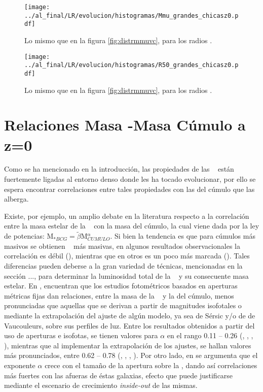 \begin{figure}[H]
 \centering
 \texttt{[image: ../al\_final/LR/evolucion/histogramas/Mmu\_grandes\_chicasz0.pdf]}
\caption{Lo mismo que en la figura \ref{fig:distrmmuvc}, para los radios \mvc.}
\label{fig:distrrmuvc}
\end{figure}

\begin{figure}[H]
 \centering
 \texttt{[image: ../al\_final/LR/evolucion/histogramas/R50\_grandes\_chicasz0.pdf]}
\caption{Lo mismo que en la figura \ref{fig:distrmmuvc}, para los radios \rum.}
\label{fig:distrrum}
\end{figure}



\section{Relaciones Masa \bcg-Masa C\'umulo a z=0}
\label{sec:mbcgmcum}

Como se ha mencionado en la introducci\'on, las propiedades de las 
\bcgs~ est\'an fuertemente ligadas al entorno denso
donde les ha tocado evolucionar, por ello se espera encontrar 
correlaciones entre tales propiedades con las
del c\'umulo que las alberga. 

Existe, por ejemplo, un amplio debate en la literatura respecto a la
correlaci\'on entre la masa estelar de la \bcg~ con la masa del c\'umulo,
la cual viene dada por la ley de potencias: M$_{*BCG}=\widetilde{\beta}$M$_{CUMULO}^{\alpha}$.	 
Si bien la tendencia es que para c\'umulos m\'as masivos se obtienen 
\bcgs~ m\'as masivas, en algunos resultados observacionales
la correlaci\'on es d\'ebil (\cite{whi08}), mientras que en otros es un poco m\'as
marcada (\cite{bel16}). 
Tales diferencias pueden deberse a la
gran variedad de t\'ecnicas, mencionadas en la secci\'on ..., para determinar la luminosidad total de la \bcg~ y 
su consecuente masa estelar. En \cite{haa10},
encuentran que los estudios fotom\'etricos basados en aperturas
m\'etricas fijas dan relaciones, entre la masa de la \bcg~ y la del c\'umulo, 
menos pronunciadas que aquellas que se derivan a partir de magnitudes isofotales 
o mediante la extrapolaci\'on del ajuste de alg\'un modelo, ya sea de S\'ersic y/o de de Vaucouleurs,
sobre sus perfiles de luz. Entre los resultados obtenidos a partir del
uso de aperturas e isofotas, se tienen valores para $\alpha$ en el rango 0.11 -- 0.26
(\cite{bro08}, \cite{whi08},
\cite{pop07}, \cite{lin04}), mientras que al implementar la extrapolaci\'on de los ajustes,
se hallan valores m\'as pronunciados, entre 0.62 -- 0.78 (\cite{sto12}, \cite{mit09}, \cite{bai14}, \cite{lid12}).
Por otro lado, en \cite{zha16} se argumenta que el exponente $\alpha$ 
crece con el tama\~no de la apertura sobre la \bcg, dando as\'i correlaciones m\'as
fuertes con las afueras de \'estas galaxias, efecto que puede justificarse mediante el
escenario de crecimiento \textit{inside-out} de las mismas.


